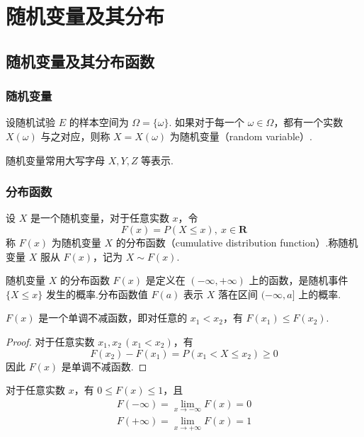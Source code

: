 
\chapter{随机变量及其分布}

\section{随机变量及其分布函数}

\subsection{随机变量}

\begin{definition}
    \indent 设随机试验 $E$ 的样本空间为 $\varOmega=\{\omega\}$. 如果对于每一个 $\omega\in\varOmega$，都有一个实数 $X(\omega)$ 与之对应，则称 $X=X(\omega)$ 为{\heiti 随机变量}（random variable）.
\end{definition}

随机变量常用大写字母 $X,Y,Z$ 等表示.

\subsection{分布函数}

\begin{definition}
    \indent 设 $X$ 是一个随机变量，对于任意实数 $x$，令
    $$
    F(x)=P(X \leqslant x), \ x \in \mathbf{R}
    $$
    称 $F(x)$ 为随机变量 $X$ 的{\heiti 分布函数}（cumulative distribution function）.称随机变量 $X$ 服从 $F(x)$，记为 $X \sim F(x)$.
\end{definition}

随机变量 $X$ 的分布函数 $F(x)$ 是定义在 $(-\infty, +\infty)$ 上的函数，是随机事件 $\{X \leqslant x\}$ 发生的概率.分布函数值 $F(a)$ 表示 $X$ 落在区间 $(-\infty,a]$ 上的概率.

\begin{property}[][单调性]
    \indent $F(x)$ 是一个单调不减函数，即对任意的 $x_1 < x_2$，有 $F(x_1) \leqslant F(x_2)$.
\end{property}

\begin{proof}
    对于任意实数 $x_1, x_2\, (x_1 < x_2)$，有
    $$
    F(x_2) - F(x_1) = P(x_1 < X \leqslant x_2) \geqslant 0
    $$
    因此 $F(x)$ 是单调不减函数.
\end{proof}

\begin{property}[][有界性]
    \indent 对于任意实数 $x$，有 $0 \leqslant F(x) \leqslant 1$，且
    \begin{gather*}
        F(-\infty)= \lim_{x \to -\infty} F(x) = 0 \\
        F(+\infty)= \lim_{x \to +\infty} F(x) = 1
    \end{gather*}
\end{property}

